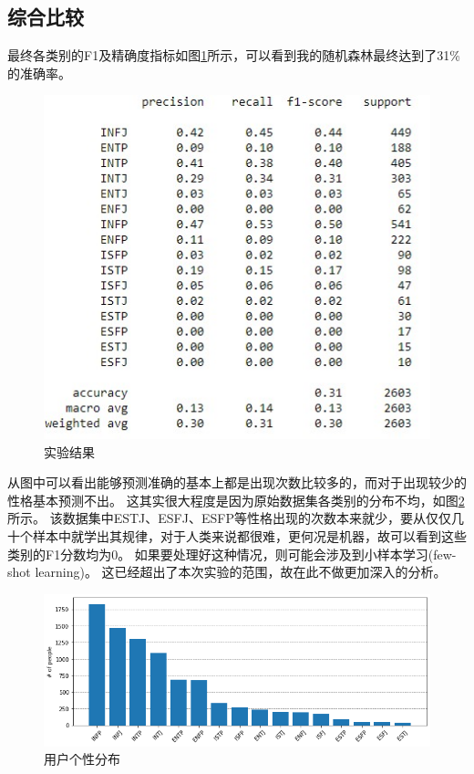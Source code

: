 \documentclass[logo,reportComp]{thesis}
\begin{document}
\subsection{综合比较}
最终各类别的F1及精确度指标如图\ref{fig:f1}所示，可以看到我的随机森林最终达到了31\%的准确率。
\begin{figure}[H]
\centering
\includegraphics[width=0.8\linewidth]{fig/report.jpg}
\caption{实验结果}
\label{fig:f1}
\end{figure}

从图中可以看出能够预测准确的基本上都是出现次数比较多的，而对于出现较少的性格基本预测不出。
这其实很大程度是因为原始数据集各类别的分布不均，如图\ref{fig:distribution}所示。
该数据集中ESTJ、ESFJ、ESFP等性格出现的次数本来就少，要从仅仅几十个样本中就学出其规律，对于人类来说都很难，更何况是机器，故可以看到这些类别的F1分数均为0。
如果要处理好这种情况，则可能会涉及到小样本学习(few-shot learning)。
这已经超出了本次实验的范围，故在此不做更加深入的分析。
\begin{figure}[H]
\centering
\includegraphics[width=\linewidth]{fig/distribution.png}
\caption{用户个性分布}
\label{fig:distribution}
\end{figure}
\end{document}
